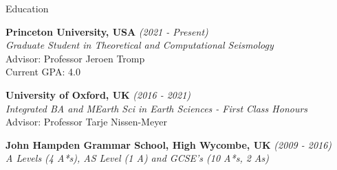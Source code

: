 \documentclass{resume}
\begin{document}
\centering 

\begin{rSection}{Education}

{\bf Princeton University, USA} \hfill {\em (2021 - Present)} 
\\{ \textit {Graduate Student in Theoretical and Computational Seismology}} \\
Advisor: Professor Jeroen Tromp \\
Current GPA: 4.0  


{\bf University of Oxford, UK} \hfill {\em (2016 - 2021)} 
\\{ \textit {Integrated BA and MEarth Sci in Earth Sciences - First Class Honours }} \\
Advisor: Professor Tarje Nissen-Meyer


{\bf John Hampden Grammar School, High Wycombe, UK} \hfill {\em  (2009 - 2016)} 
\\ { \textit {A Levels (4 A*s), AS Level (1 A) and GCSE’s (10 A*s, 2 As) }} \hfill


\end{rSection}
\end{document}
